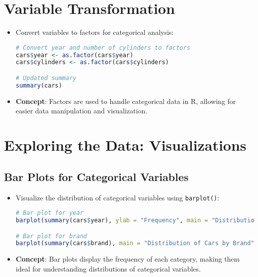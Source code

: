 \section{Variable Transformation}
\begin{itemize}
    \item Convert variables to factors for categorical analysis:
\begin{lstlisting}[language=R]
# Convert year and number of cylinders to factors
cars$year <- as.factor(cars$year)
cars$cylinders <- as.factor(cars$cylinders)

# Updated summary
summary(cars)
\end{lstlisting}
    \item \textbf{Concept}: Factors are used to handle categorical data in R, allowing for easier data manipulation and visualization.
\end{itemize}

\section{Exploring the Data: Visualizations}
\subsection{Bar Plots for Categorical Variables}
\begin{itemize}
    \item Visualize the distribution of categorical variables using \texttt{barplot()}:
\begin{lstlisting}[language=R]
# Bar plot for year
barplot(summary(cars$year), ylab = "Frequency", main = "Distribution of Cars by Year")

# Bar plot for brand
barplot(summary(cars$brand), main = "Distribution of Cars by Brand")
\end{lstlisting}
    \item \textbf{Concept}: Bar plots display the frequency of each category, making them ideal for understanding distributions of categorical variables.
\end{itemize}

